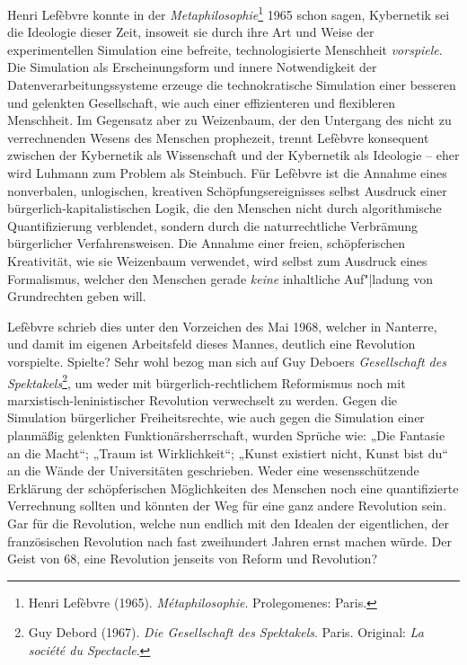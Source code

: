 \documentclass[a4paper,11pt]{article}
\begin{document}
Henri Lefèbvre konnte in der \emph{Metaphilosophie}\footnote{Henri Lefèbvre
  (1965).  \emph{Métaphilosophie}. Prolegomenes: Paris.} 1965 schon sagen,
Kybernetik sei die Ideologie dieser Zeit, insoweit sie durch ihre Art und
Weise der experimentellen Simulation eine befreite, technologisierte
Menschheit \emph{vorspiele}. Die Simulation als Erscheinungsform und innere
Notwendigkeit der Datenverarbeitungssysteme erzeuge die technokratische
Simulation einer besseren und gelenkten Gesellschaft, wie auch einer
effizienteren und flexibleren Menschheit. Im Gegensatz aber zu Weizenbaum, der
den Untergang des nicht zu verrechnenden Wesens des Menschen prophezeit,
trennt Lefèbvre konsequent zwischen der Kybernetik als Wissenschaft und der
Kybernetik als Ideologie -- eher wird Luhmann zum Problem als Steinbuch. Für
Lefèbvre ist die Annahme eines nonverbalen, unlogischen, kreativen
Schöpfungsereignisses selbst Ausdruck einer bürgerlich-kapitalistischen Logik,
die den Menschen nicht durch algorithmische Quantifizierung verblendet,
sondern durch die naturrechtliche Verbrämung bürgerlicher Verfahrensweisen.
Die Annahme einer freien, schöpferischen Kreativität, wie sie Weizenbaum
verwendet, wird selbst zum Ausdruck eines Formalismus, welcher den Menschen
gerade \emph{keine} inhaltliche Auf"|ladung von Grundrechten geben will.

Lefèbvre schrieb dies unter den Vorzeichen des Mai 1968, welcher in Nanterre,
und damit im eigenen Arbeitsfeld dieses Mannes, deutlich eine Revolution
vorspielte. Spielte? Sehr wohl bezog man sich auf Guy Deboers
\emph{Gesellschaft des Spektakels}\footnote{Guy Debord (1967). \emph{Die
    Gesellschaft des Spektakels}.  Paris. Original: \emph{La société du
    Spectacle}. }, um weder mit bürgerlich-rechtlichem Reformismus noch mit
marxistisch-leninistischer Revolution verwechselt zu werden. Gegen die
Simulation bürgerlicher Freiheitsrechte, wie auch gegen die Simulation einer
planmäßig gelenkten Funktionärsherrschaft, wurden Sprüche wie: „Die Fantasie
an die Macht“; „Traum ist Wirklichkeit“; „Kunst existiert nicht, Kunst bist
du“ an die Wände der Universitäten geschrieben.  Weder eine wesensschützende
Erklärung der schöpferischen Möglichkeiten des Menschen noch eine
quantifizierte Verrechnung sollten und könnten der Weg für eine ganz andere
Revolution sein.  Gar für die Revolution, welche nun endlich mit den Idealen
der eigentlichen, der französischen Revolution nach fast zweihundert Jahren
ernst machen würde. Der Geist von 68, eine Revolution jenseits von Reform und
Revolution?
\end{document}
